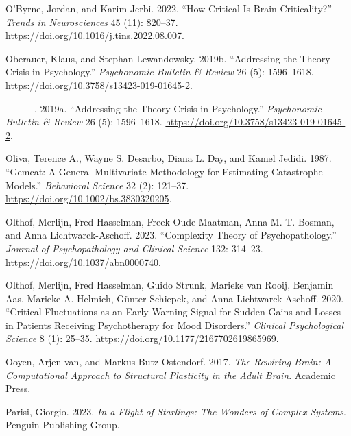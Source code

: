\documentclass[
  a4paper,
  DIV=11,
  numbers=noendperiod,
  oneside]{scrreprt}
\newlength{\cslhangindent}
\newlength{\cslentryspacingunit} %
\newenvironment{CSLReferences}[2] %
 {%
  \setlength{\parindent}{0pt}
  \ifodd #1
  \let\oldpar\par
  \def\par{\hangindent=\cslhangindent\oldpar}
  \fi
  \setlength{\parskip}{#2\cslentryspacingunit}
 }%
 {}
\begin{document}
\begin{CSLReferences}{1}{0}
\leavevmode{}%
O'Byrne, Jordan, and Karim Jerbi. 2022. {``How Critical Is Brain
Criticality?''} \emph{Trends in Neurosciences} 45 (11): 820--37.
\url{https://doi.org/10.1016/j.tins.2022.08.007}.

\leavevmode{}%
Oberauer, Klaus, and Stephan Lewandowsky. 2019b. {``Addressing the
Theory Crisis in Psychology.''} \emph{Psychonomic Bulletin \& Review} 26
(5): 1596--1618. \url{https://doi.org/10.3758/s13423-019-01645-2}.

\leavevmode{}%
---------. 2019a. {``Addressing the Theory Crisis in Psychology.''}
\emph{Psychonomic Bulletin \& Review} 26 (5): 1596--1618.
\url{https://doi.org/10.3758/s13423-019-01645-2}.

\leavevmode{}%
Oliva, Terence A., Wayne S. Desarbo, Diana L. Day, and Kamel Jedidi.
1987. {``Gemcat: {A} General Multivariate Methodology for Estimating
Catastrophe Models.''} \emph{Behavioral Science} 32 (2): 121--37.
\url{https://doi.org/10.1002/bs.3830320205}.

\leavevmode{}%
Olthof, Merlijn, Fred Hasselman, Freek Oude Maatman, Anna M. T. Bosman,
and Anna Lichtwarck-Aschoff. 2023. {``Complexity Theory of
Psychopathology.''} \emph{Journal of Psychopathology and Clinical
Science} 132: 314--23. \url{https://doi.org/10.1037/abn0000740}.

\leavevmode{}%
Olthof, Merlijn, Fred Hasselman, Guido Strunk, Marieke van Rooij,
Benjamin Aas, Marieke A. Helmich, Günter Schiepek, and Anna
Lichtwarck-Aschoff. 2020. {``Critical {Fluctuations} as an
{Early-Warning Signal} for {Sudden Gains} and {Losses} in {Patients
Receiving Psychotherapy} for {Mood Disorders}.''} \emph{Clinical
Psychological Science} 8 (1): 25--35.
\url{https://doi.org/10.1177/2167702619865969}.

\leavevmode{}%
Ooyen, Arjen van, and Markus Butz-Ostendorf. 2017. \emph{The {Rewiring
Brain}: {A Computational Approach} to {Structural Plasticity} in the
{Adult Brain}}. {Academic Press}.

\leavevmode{}%
Parisi, Giorgio. 2023. \emph{In a Flight of Starlings: The Wonders of
Complex Systems}. Penguin Publishing Group.


\end{CSLReferences}
\end{document}
